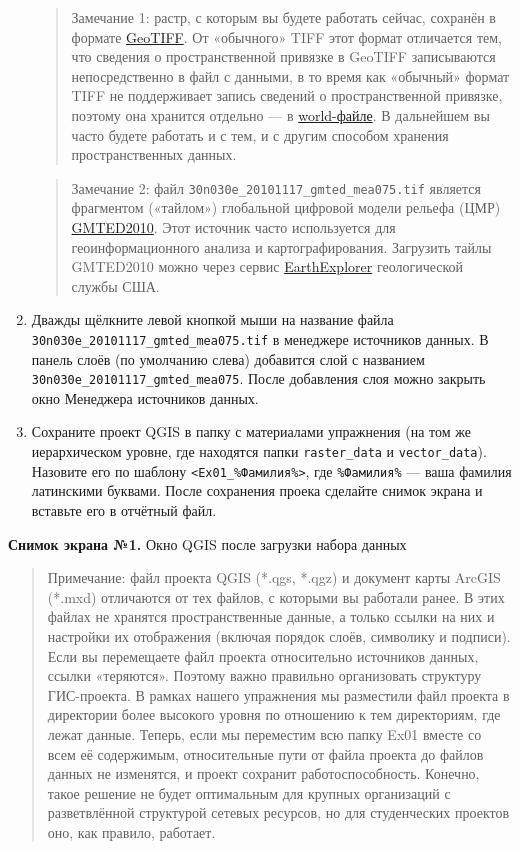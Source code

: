 \documentclass[
  12pt,
]{book}
\begin{document}
\begin{enumerate}
  \begin{quote}
  Замечание 1: растр, с которым вы будете работать сейчас, сохранён в формате \href{https://www.opengeospatial.org/standards/geotiff}{GeoTIFF}. От «обычного» TIFF этот формат отличается тем, что сведения о пространственной привязке в GeoTIFF записываются непосредственно в файл с данными, в то время как «обычный» формат TIFF не поддерживает запись сведений о пространственной привязке, поэтому она хранится отдельно --- в \href{https://en.wikipedia.org/wiki/World_file}{world-файле}. В дальнейшем вы часто будете работать и с тем, и с другим способом хранения пространственных данных.
  \end{quote}

  \begin{quote}
  Замечание 2: файл \texttt{30n030e\_20101117\_gmted\_mea075.tif} является фрагментом («тайлом») глобальной цифровой модели рельефа (ЦМР) \href{https://www.usgs.gov/land-resources/eros/coastal-changes-and-impacts/gmted2010}{GMTED2010}. Этот источник часто используется для геоинформационного анализа и картографирования. Загрузить тайлы GMTED2010 можно через сервис \href{https://earthexplorer.usgs.gov/}{EarthExplorer} геологической службы США.
  \end{quote}
\item
  Дважды щёлкните левой кнопкой мыши на название файла \texttt{30n030e\_20101117\_gmted\_mea075.tif} в менеджере источников данных. В панель слоёв (по умолчанию слева) добавится слой с названием \texttt{30n030e\_20101117\_gmted\_mea075}. После добавления слоя можно закрыть окно Менеджера источников данных.
\item
  Сохраните проект QGIS в папку с материалами упражнения (на том же иерархическом уровне, где находятся папки \texttt{raster\_data} и \texttt{vector\_data}). Назовите его по шаблону \texttt{\textless{}Ex01\_\%Фамилия\%\textgreater{}}, где \texttt{\%Фамилия\%} --- ваша фамилия латинскими буквами. После сохранения проека сделайте снимок экрана и вставьте его в отчётный файл.
\end{enumerate}

\textbf{Снимок экрана №1.} Окно QGIS после загрузки набора данных

\begin{quote}
Примечание: файл проекта QGIS (*.qgs, *.qgz) и документ карты ArcGIS (*.mxd) отличаются от тех файлов, с которыми вы работали ранее. В этих файлах не хранятся пространственные данные, а только ссылки на них и настройки их отображения (включая порядок слоёв, символику и подписи). Если вы перемещаете файл проекта относительно источников данных, ссылки «теряются». Поэтому важно правильно организовать структуру ГИС-проекта. В рамках нашего упражнения мы разместили файл проекта в директории более высокого уровня по отношению к тем директориям, где лежат данные. Теперь, если мы переместим всю папку Ex01 вместе со всем её содержимым, относительные пути от файла проекта до файлов данных не изменятся, и проект сохранит работоспособность. Конечно, такое решение не будет оптимальным для крупных организаций с разветвлённой структурой сетевых ресурсов, но для студенческих проектов оно, как правило, работает.
\end{quote}
\end{document}
